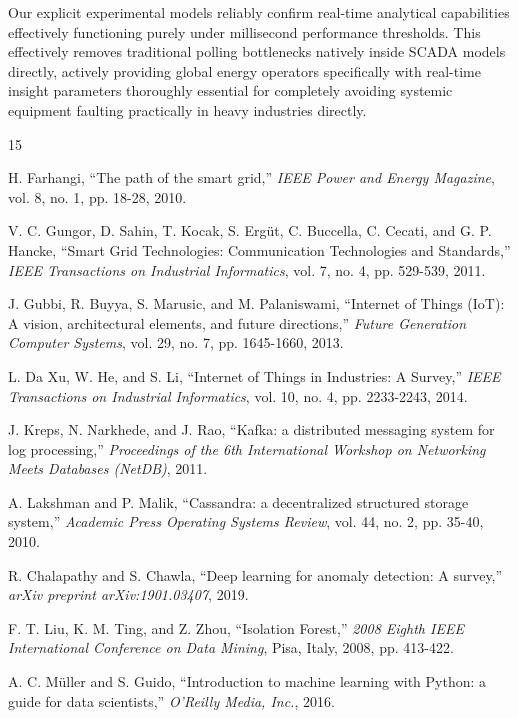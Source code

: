 \documentclass[12pt, a4paper]{article}
\begin{document}
Our explicit experimental models reliably confirm real-time analytical capabilities effectively functioning purely under millisecond performance thresholds. This effectively removes traditional polling bottlenecks natively inside SCADA models directly, actively providing global energy operators specifically with real-time insight parameters thoroughly essential for completely avoiding systemic equipment faulting practically in heavy industries directly. 

\begin{thebibliography}{15}

H. Farhangi, ``The path of the smart grid,'' \emph{IEEE Power and Energy Magazine}, vol. 8, no. 1, pp. 18-28, 2010.

V. C. Gungor, D. Sahin, T. Kocak, S. Ergüt, C. Buccella, C. Cecati, and G. P. Hancke, ``Smart Grid Technologies: Communication Technologies and Standards,'' \emph{IEEE Transactions on Industrial Informatics}, vol. 7, no. 4, pp. 529-539, 2011.

J. Gubbi, R. Buyya, S. Marusic, and M. Palaniswami, ``Internet of Things (IoT): A vision, architectural elements, and future directions,'' \emph{Future Generation Computer Systems}, vol. 29, no. 7, pp. 1645-1660, 2013.

L. Da Xu, W. He, and S. Li, ``Internet of Things in Industries: A Survey,'' \emph{IEEE Transactions on Industrial Informatics}, vol. 10, no. 4, pp. 2233-2243, 2014.

J. Kreps, N. Narkhede, and J. Rao, ``Kafka: a distributed messaging system for log processing,'' \emph{Proceedings of the 6th International Workshop on Networking Meets Databases (NetDB)}, 2011.

A. Lakshman and P. Malik, ``Cassandra: a decentralized structured storage system,'' \emph{Academic Press Operating Systems Review}, vol. 44, no. 2, pp. 35-40, 2010.

R. Chalapathy and S. Chawla, ``Deep learning for anomaly detection: A survey,'' \emph{arXiv preprint arXiv:1901.03407}, 2019.

F. T. Liu, K. M. Ting, and Z. Zhou, ``Isolation Forest,'' \emph{2008 Eighth IEEE International Conference on Data Mining}, Pisa, Italy, 2008, pp. 413-422.

A. C. Müller and S. Guido, ``Introduction to machine learning with Python: a guide for data scientists,'' \emph{O'Reilly Media, Inc.}, 2016.


\end{thebibliography}
\end{document}
